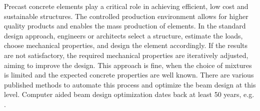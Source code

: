 Precast concrete elements play a critical role in achieving efficient, low cost and sustainable structures.
The controlled production environment allows for higher quality products and enables the mass production of elements.
In the standard design approach, engineers or architects select a structure, estimate the loads, choose mechanical properties, and design the element accordingly. 
If the results are not satisfactory, the required mechanical properties are iteratively adjusted, aiming to improve the design.
This approach is fine, when the choice of mixtures is limited and the expected concrete properties are well known.
There are various published methods to automate this process and optimize the beam design at this level.
Computer aided beam design optimization dates back at least 50 years, e.g. \cite{Haung1967}.


